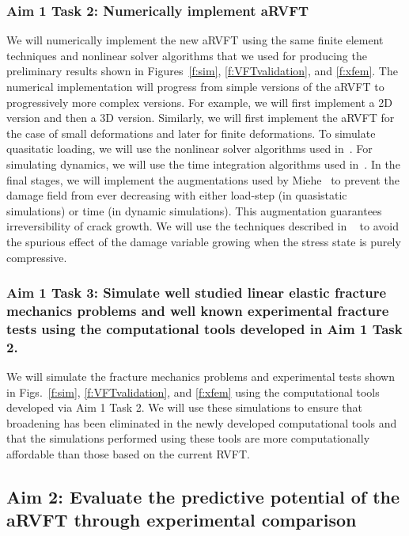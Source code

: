 \documentclass[10pt,letterpaper]{article}
\begin{document}
   \subsubsection{Aim 1 Task 2: Numerically implement aRVFT}
    We will numerically implement the new aRVFT using the same finite element techniques and nonlinear solver algorithms that we used for producing the preliminary results shown in Figures~\ref{f:sim}, \ref{f:VFTvalidation}, and \ref{f:xfem}.  The numerical implementation will progress from simple versions of the aRVFT to  progressively more complex versions.  For example, we will first implement a 2D version and then a 3D version.  Similarly, we will first implement the aRVFT for the case of small deformations and later for finite deformations.   To simulate quasitatic loading, we will use the nonlinear solver algorithms used in~\cite{miehe2010phase}. For simulating dynamics, we  will use the time integration algorithms used in~\cite{borden2012phase}. In the final stages, we will implement the augmentations used by Miehe~\cite{miehe2010phase} to prevent the damage field from ever decreasing with either   load-step (in quasistatic simulations) or time (in dynamic simulations). This augmentation guarantees irreversibility of crack growth. We will use the techniques described in ~\cite{miehe2010phase}  to  avoid the spurious effect of the damage variable growing  when the stress state is purely compressive.

  \subsubsection{Aim 1 Task 3: Simulate well studied linear elastic fracture mechanics problems and well known  experimental  fracture tests using the  computational tools developed in Aim 1 Task 2.}
    We will simulate the  fracture mechanics problems and experimental tests shown in Figs.~\ref{f:sim}, \ref{f:VFTvalidation},  and \ref{f:xfem} using the  computational tools developed via Aim 1 Task 2.
    We will use these simulations to ensure that broadening has  been eliminated in the newly developed computational tools and that the  simulations performed using  these tools are more computationally affordable than those based on the current RVFT.

  \subsection{Aim 2: Evaluate the predictive potential of the aRVFT through experimental comparison}
    \label{s:A2}
\end{document}
